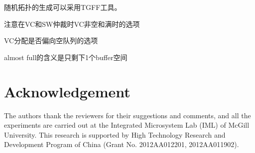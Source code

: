 ﻿\documentclass[10pt,journal]{IEEEtran}
\begin{document}
随机拓扑的生成可以采用TGFF工具。

注意在VC和SW仲裁时VC非空和满时的选项

VC分配是否偏向空队列的选项

almost full的含义是只剩下1个buffer空间

\section*{Acknowledgement}
The authors thank the reviewers for their suggestions and comments, and all the experiments are carried out at the Integrated Microsystem Lab (IML) of McGill University. This research is supported by High Technology Research and Development Program of China (Grant No. 2012AA012201, 2012AA011902).



\end{document}
